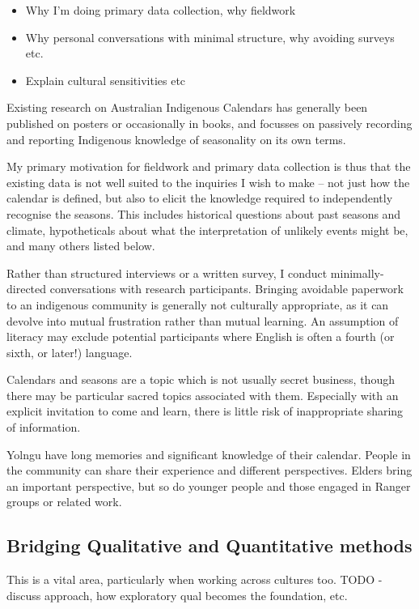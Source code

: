 \begin{itemize}
\item Why I'm doing primary data collection, why fieldwork
\item Why personal conversations with minimal structure, why avoiding surveys etc.
\item Explain cultural sensitivities etc
\end{itemize}


Existing research on Australian Indigenous Calendars has generally been 
published on posters or occasionally in books, and focusses on passively 
recording and reporting Indigenous knowledge of seasonality on its own terms.  

My primary motivation for fieldwork and primary data collection is thus that 
the existing data is not well suited to the inquiries I wish to make – not just 
how the calendar is defined, but also to elicit the knowledge required to 
independently recognise the seasons.  This includes historical questions about 
past seasons and climate, hypotheticals about what the interpretation of 
unlikely events might be, and many others listed below.

Rather than structured interviews or a written survey, I conduct minimally-
directed conversations with research participants.  Bringing avoidable 
paperwork to an indigenous community is generally not culturally appropriate, 
as it can devolve into mutual frustration rather than mutual learning.  An 
assumption of literacy may exclude potential participants where English is 
often a fourth (or sixth, or later!) language.

Calendars and seasons are a topic which is not usually secret business, though 
there may be particular sacred topics associated with them.  Especially with an 
explicit invitation to come and learn, there is little risk of inappropriate 
sharing of information.

Yolngu have long memories and significant knowledge of their 
calendar.  People in the community can share their experience and different 
perspectives.  Elders bring an important perspective, but so do younger people 
and those engaged in Ranger groups or related work.



\subsection{Bridging Qualitative and Quantitative methods}
This is a vital area, particularly when working across cultures too.
TODO - discuss approach, how exploratory qual becomes the foundation, etc.



